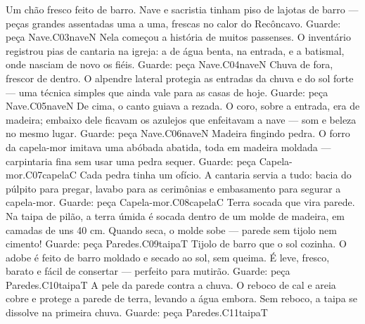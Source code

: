 \linhacartas
{
{Um chão fresco feito de barro.}
{Nave e sacristia tinham piso de lajotas de barro --- peças grandes assentadas uma a uma, frescas no calor do Recôncavo.}
{Guarde: peça Nave.}{C03}{nave}{N}}
{
{Nela começou a história de muitos passenses.}
{O inventário registrou pias de cantaria na igreja: a de água benta, na entrada, e a batismal, onde nasciam de novo os fiéis.}
{Guarde: peça Nave.}{C04}{nave}{N}}
{
{Chuva de fora, frescor de dentro.}
{O alpendre lateral protegia as entradas da chuva e do sol forte --- uma técnica simples que ainda vale para as casas de hoje.}
{Guarde: peça Nave.}{C05}{nave}{N}}
\linhacartas
{
{De cima, o canto guiava a rezada.}
{O coro, sobre a entrada, era de madeira; embaixo dele ficavam os azulejos que enfeitavam a nave --- som e beleza no mesmo lugar.}
{Guarde: peça Nave.}{C06}{nave}{N}}
{
{Madeira fingindo pedra.}
{O forro da capela-mor imitava uma abóbada abatida, toda em madeira moldada --- carpintaria fina sem usar uma pedra sequer.}
{Guarde: peça Capela-mor.}{C07}{capela}{C}}
{
{Cada pedra tinha um ofício.}
{A cantaria servia a tudo: bacia do púlpito para pregar, lavabo para as cerimônias e embasamento para segurar a capela-mor.}
{Guarde: peça Capela-mor.}{C08}{capela}{C}}
\linhacartas
{
{Terra socada que vira parede.}
{Na taipa de pilão, a terra úmida é socada dentro de um molde de madeira, em camadas de uns 40 cm. Quando seca, o molde sobe --- parede sem tijolo nem cimento!}
{Guarde: peça Paredes.}{C09}{taipa}{T}}
{
{Tijolo de barro que o sol cozinha.}
{O adobe é feito de barro moldado e secado ao sol, sem queima. É leve, fresco, barato e fácil de consertar --- perfeito para mutirão.}
{Guarde: peça Paredes.}{C10}{taipa}{T}}
{
{A pele da parede contra a chuva.}
{O reboco de cal e areia cobre e protege a parede de terra, levando a água embora. Sem reboco, a taipa se dissolve na primeira chuva.}
{Guarde: peça Paredes.}{C11}{taipa}{T}}
\newpage

